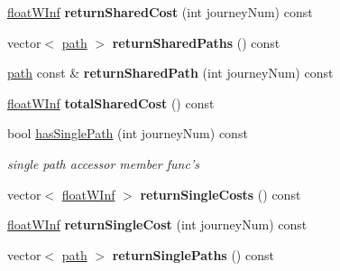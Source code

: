 \begin{DoxyCompactItemize}
\item 
\hypertarget{classgraphGroup_a6064d24e9224f84c12f275b0e5e18a70}{
\hyperlink{classfloatWInf}{floatWInf} {\bfseries returnSharedCost} (int journeyNum) const }
\label{classgraphGroup_a6064d24e9224f84c12f275b0e5e18a70}

\item 
\hypertarget{classgraphGroup_a1e8a2f342d825ddceb2c4f75edeb587b}{
vector$<$ \hyperlink{classpath}{path} $>$ {\bfseries returnSharedPaths} () const }
\label{classgraphGroup_a1e8a2f342d825ddceb2c4f75edeb587b}

\item 
\hypertarget{classgraphGroup_a8b4ddd5beb2460cc207ce72d68e62128}{
\hyperlink{classpath}{path} const \& {\bfseries returnSharedPath} (int journeyNum) const }
\label{classgraphGroup_a8b4ddd5beb2460cc207ce72d68e62128}

\item 
\hypertarget{classgraphGroup_a4dd6857b9ac706dc6cdf248f4fa83ecc}{
\hyperlink{classfloatWInf}{floatWInf} {\bfseries totalSharedCost} () const }
\label{classgraphGroup_a4dd6857b9ac706dc6cdf248f4fa83ecc}

\item 
\hypertarget{classgraphGroup_a4d69526b7ca24fac86461c9a8a0fa759}{
bool \hyperlink{classgraphGroup_a4d69526b7ca24fac86461c9a8a0fa759}{hasSinglePath} (int journeyNum) const }
\label{classgraphGroup_a4d69526b7ca24fac86461c9a8a0fa759}

\begin{DoxyCompactList}\small\item\em single path accessor member func's \end{DoxyCompactList}\item 
\hypertarget{classgraphGroup_aed0ac6fa5dcb92e346fa3bc992a945f0}{
vector$<$ \hyperlink{classfloatWInf}{floatWInf} $>$ {\bfseries returnSingleCosts} () const }
\label{classgraphGroup_aed0ac6fa5dcb92e346fa3bc992a945f0}

\item 
\hypertarget{classgraphGroup_ac6689550d898be797e032e3920ed1804}{
\hyperlink{classfloatWInf}{floatWInf} {\bfseries returnSingleCost} (int journeyNum) const }
\label{classgraphGroup_ac6689550d898be797e032e3920ed1804}

\item 
\hypertarget{classgraphGroup_a376f0acc695c3574acf741147499b0a0}{
vector$<$ \hyperlink{classpath}{path} $>$ {\bfseries returnSinglePaths} () const }
\label{classgraphGroup_a376f0acc695c3574acf741147499b0a0}


\end{DoxyCompactItemize}
